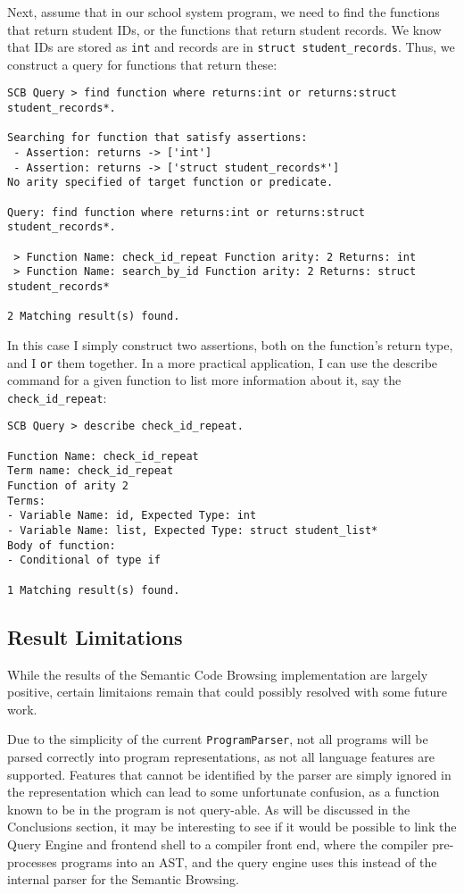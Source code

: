 \documentclass{article}
\begin{document}
Next, assume that in our school system program, we need to find the functions that return student IDs, or the functions that return student records. We know that IDs are stored as \texttt{int} and records are in \texttt{struct student\_records}. Thus, we construct a query for functions that return these:

\begin{Verbatim}[frame=single]
SCB Query > find function where returns:int or returns:struct student_records*.

Searching for function that satisfy assertions:
 - Assertion: returns -> ['int']
 - Assertion: returns -> ['struct student_records*']
No arity specified of target function or predicate.

Query: find function where returns:int or returns:struct student_records*.

 > Function Name: check_id_repeat Function arity: 2 Returns: int
 > Function Name: search_by_id Function arity: 2 Returns: struct student_records*

2 Matching result(s) found.
\end{Verbatim}

In this case I simply construct two assertions, both on the function's return type, and I \texttt{or} them together. In a more practical application, I can use the describe command for a given function to list more information about it, say the \texttt{check\_id\_repeat}:

\begin{Verbatim}[frame=single]
SCB Query > describe check_id_repeat.

Function Name: check_id_repeat
Term name: check_id_repeat
Function of arity 2
Terms:
- Variable Name: id, Expected Type: int
- Variable Name: list, Expected Type: struct student_list*
Body of function:
- Conditional of type if

1 Matching result(s) found.
\end{Verbatim}

\subsection{Result Limitations}

While the results of the Semantic Code Browsing implementation are largely positive, certain limitaions remain that could possibly resolved with some future work. 

Due to the simplicity of the current \texttt{ProgramParser}, not all programs will be parsed correctly into program representations, as not all language features are supported. Features that cannot be identified by the parser are simply ignored in the representation which can lead to some unfortunate confusion, as a function known to be in the program is not query-able. As will be discussed in the Conclusions section, it may be interesting to see if it would be possible to link the Query Engine and frontend shell to a compiler front end, where the compiler pre-processes programs into an AST, and the query engine uses this instead of the internal parser for the Semantic Browsing.
\end{document}
